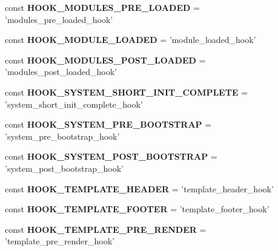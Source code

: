 \begin{DoxyCompactItemize}
\item 
\hypertarget{class_hooks_a1243ca5e4577fe5bc56a2940997b34c8}{
const {\bfseries HOOK\_\-MODULES\_\-PRE\_\-LOADED} = 'modules\_\-pre\_\-loaded\_\-hook'}
\label{class_hooks_a1243ca5e4577fe5bc56a2940997b34c8}

\item 
\hypertarget{class_hooks_a75d72c482d31e0b30cc8678f0bb9fd5b}{
const {\bfseries HOOK\_\-MODULE\_\-LOADED} = 'module\_\-loaded\_\-hook'}
\label{class_hooks_a75d72c482d31e0b30cc8678f0bb9fd5b}

\item 
\hypertarget{class_hooks_a332f6bbf964e15a11998fca19ef2f6c4}{
const {\bfseries HOOK\_\-MODULES\_\-POST\_\-LOADED} = 'modules\_\-post\_\-loaded\_\-hook'}
\label{class_hooks_a332f6bbf964e15a11998fca19ef2f6c4}

\item 
\hypertarget{class_hooks_a83d80b330355826f079f8827a78b2d00}{
const {\bfseries HOOK\_\-SYSTEM\_\-SHORT\_\-INIT\_\-COMPLETE} = 'system\_\-short\_\-init\_\-complete\_\-hook'}
\label{class_hooks_a83d80b330355826f079f8827a78b2d00}

\item 
\hypertarget{class_hooks_ad8bba3640412d5e5fd94fe1065a5e77e}{
const {\bfseries HOOK\_\-SYSTEM\_\-PRE\_\-BOOTSTRAP} = 'system\_\-pre\_\-bootstrap\_\-hook'}
\label{class_hooks_ad8bba3640412d5e5fd94fe1065a5e77e}

\item 
\hypertarget{class_hooks_ae130629abace2296f758c2b27cd33967}{
const {\bfseries HOOK\_\-SYSTEM\_\-POST\_\-BOOTSTRAP} = 'system\_\-post\_\-bootstrap\_\-hook'}
\label{class_hooks_ae130629abace2296f758c2b27cd33967}

\item 
\hypertarget{class_hooks_a36dd8fa3fe7eb68be1e314cf81c5d234}{
const {\bfseries HOOK\_\-TEMPLATE\_\-HEADER} = 'template\_\-header\_\-hook'}
\label{class_hooks_a36dd8fa3fe7eb68be1e314cf81c5d234}

\item 
\hypertarget{class_hooks_a7492fed205e188df54e23b56bc97628e}{
const {\bfseries HOOK\_\-TEMPLATE\_\-FOOTER} = 'template\_\-footer\_\-hook'}
\label{class_hooks_a7492fed205e188df54e23b56bc97628e}

\item 
\hypertarget{class_hooks_aafe01948844f45405d0fdbe31ec72258}{
const {\bfseries HOOK\_\-TEMPLATE\_\-PRE\_\-RENDER} = 'template\_\-pre\_\-render\_\-hook'}
\label{class_hooks_aafe01948844f45405d0fdbe31ec72258}


\end{DoxyCompactItemize}
